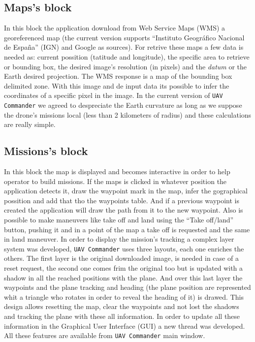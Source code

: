 \documentclass{llncs}
\begin{document}
\subsection{Maps's block}
\label{maps_block}

In this block the application download from Web Service Maps (WMS) a georeferenced map (the current version supports ``Instituto Geográfico Nacional de España'' (IGN) and Google as sources). For retrive these maps a few data is needed as: current possition (tatitude and longitude), the specific area to retrieve or bounding box, the desired image's resolution (in pixels) and the \textit{datum} or the Earth desired projection.
The WMS response is a map of the bounding box delimited zone. With this image and de input data its possible to infer the coordinates of a specific pixel in the image. In the current version of \texttt{UAV Commander} we agreed to despreciate the Earth curvature as long as we suppose the drone's missions local (less than 2 kilometers of radius) and these calculations are really simple.

\subsection{Missions's block}
\label{missions_block}

In this block the map is displayed and becomes interactive in order to help operator to build missions. If the maps is clicked in whatever position the application detects it, draw the waypoint mark in the map, infer the gographical possition and add that tho the waypoints table. And if a previous waypoint is created the application will draw the path from it to the new waypoint. Also is possible to make maneuvers like take off and land using the ``Take off/land'' button, pushing it and in a point of the map a take off is requested and the same in land maneuver.
In order to display the mission's tracking a complex layer system was developed, \texttt{UAV Commander} uses three layouts,  each one enriches the others. The first layer is the original downloaded image, is needed in case of a reset request, the second one comes frim the original too but is updated with a shadow in all the reached positions with the plane. And over this last layer the waypoints and the plane tracking and heading (the plane position are represented whit a triangle who rotates in order to reveal the heading of it) is drawed. This design allows resetting the map, clear the waypoints and not lost the shadows and tracking the plane with these all information.
In order to update all these information in the Graphical User Interface (GUI) a new thread was developed.
All these features are available from \texttt{UAV Commander} main window.
\end{document}
